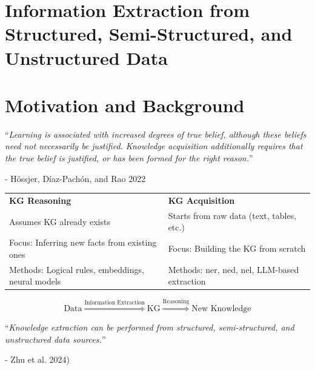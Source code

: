 

\section*{Information Extraction from Structured, Semi-Structured, and Unstructured Data}


\section{Motivation and Background}


\begin{center}
    ``\textit{Learning is associated with increased degrees of true belief, although these beliefs need not
    necessarily be justified. Knowledge acquisition additionally requires that the true belief is
    justified, or has been formed for the right reason.}''
\end{center}
- Hössjer, Díaz-Pachón, and Rao 2022

\begin{mytable}
    \begin{tabular}{p{} p{}}

        \textbf{KG Reasoning} & \textbf{KG Acquisition} \\

        Assumes KG already exists &
        Starts from raw data (text, tables, etc.) \\

        Focus: Inferring new facts from existing ones &
        Focus: Building the KG from scratch \\

        Methods: Logical rules, embeddings, neural models &
        Methods: \gls{ner}, \gls{ned}, \gls{nel}, LLM-based extraction \\

    \end{tabular}
    \caption{Comparison of KG Reasoning and KG Acquisition.}
    \label{tab:kg_reasoning_vs_acquisition}
\end{mytable}

\[
    \text{Data} \overset{\text{Information Extraction}}{\Rightarrow} \text{KG} \overset{\text{Reasoning}}{\Rightarrow} \text{New Knowledge}
\]

\begin{center}
    ``\textit{Knowledge extraction can be performed from structured,
        semi-structured, and unstructured data sources.}''
\end{center}
- Zhu et al. 2024)

